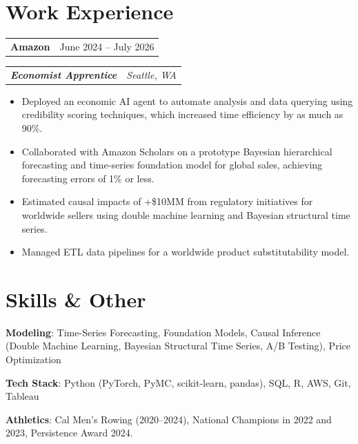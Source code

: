\documentclass[11pt]{article}
\makeatletter
\newcommand{\entry}[2]{\begin{tabularx}{\textwidth}{@{}X r@{}}#1 & #2\end{tabularx}\par}
\makeatother
\begin{document}
\section{Work Experience}
\entry{\textbf{Amazon}}{June 2024 -- July 2026}
\entry{\textbf{\textit{Economist Apprentice}}}{\textit{Seattle, WA}}
\begin{itemize}
  \item Deployed an economic AI agent to automate analysis and data querying using credibility scoring techniques, which increased time efficiency by as much as 90\%.
  \item Collaborated with Amazon Scholars on a prototype Bayesian hierarchical forecasting and time-series foundation model for global sales, achieving forecasting errors of 1\% or less.
  \item Estimated causal impacts of +\$10MM from regulatory initiatives for worldwide sellers using double machine learning and Bayesian structural time series.
  \item Managed ETL data pipelines for a worldwide product substitutability model.
\end{itemize}

\section{Skills \& Other}
\textbf{Modeling}: Time-Series Forecasting, Foundation Models, Causal Inference (Double Machine Learning, Bayesian Structural Time Series, A/B Testing), Price Optimization\par\vspace{2pt}
\textbf{Tech Stack}: Python (PyTorch, PyMC, scikit-learn, pandas), SQL, R, AWS, Git, Tableau\par\vspace{2pt}
\textbf{Athletics}: Cal Men's Rowing (2020--2024), National Champions in 2022 and 2023, Persistence Award 2024.
\end{document}

